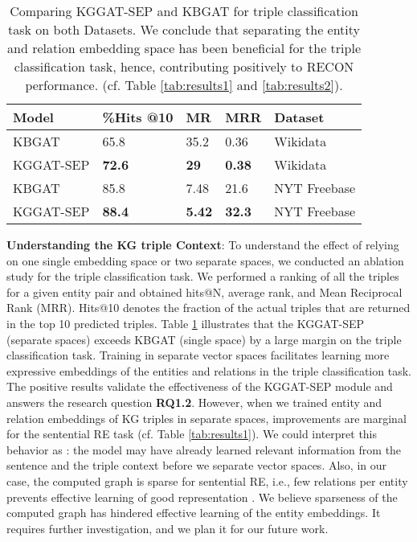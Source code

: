 \documentclass[sigconf]{acmart}
\newlength\Origarrayrulewidth
\newcommand{\Cline}[1]{\noalign{\global\setlength\Origarrayrulewidth{\arrayrulewidth}}\noalign{\global\setlength\arrayrulewidth{1.1pt}}\cline{#1}\noalign{\global\setlength\arrayrulewidth{\Origarrayrulewidth}}}
\begin{document}
\begin{table}[!htb]
    \centering
    \begin{tabular}{p{1.8cm}|p{1.5cm}|p{0.8cm}|p{0.8cm}|p{2.0cm}}
\toprule
\textbf{Model} & \%\textbf{Hits @10} & \textbf{MR} & \textbf{MRR}& \textbf{Dataset} \\
\midrule
        KBGAT & 65.8 & 35.2 & 0.36 & Wikidata\\
        KGGAT-SEP  & \textbf{72.6} &\textbf{29} & \textbf{0.38}& Wikidata \\
        \Cline{1-5}
         KBGAT & 85.8 & 7.48 & 21.6 & NYT Freebase\\
        KGGAT-SEP  & \textbf{88.4} &\textbf{5.42} & \textbf{32.3}& NYT Freebase \\
      \bottomrule
    \end{tabular}
    \caption{Comparing KGGAT-SEP and KBGAT for triple classification task on both Datasets. We conclude that separating the entity and relation embedding space has been beneficial for the triple classification task, hence, contributing positively to RECON performance. (cf. Table \ref{tab:results1} and \ref{tab:results2}).}
    \label{tab:tab-abl2}
        \vspace{-2mm}
\end{table}


\textbf{Understanding the KG triple Context}: To understand the effect of relying on one single embedding space or two separate spaces, we conducted an ablation study for the triple classification task. We performed a ranking of all the triples for a given entity pair and obtained hits@N, average rank, and Mean Reciprocal Rank (MRR). Hits@10 denotes the fraction of the actual triples that are returned in the top 10 predicted triples. Table \ref{tab:tab-abl2} illustrates that the KGGAT-SEP (separate spaces) exceeds KBGAT (single space) by a large margin on the triple classification task. Training in separate vector spaces facilitates learning more expressive embeddings of the entities and relations in the triple classification task. The positive results validate the effectiveness of the KGGAT-SEP module and answers the research question \textbf{RQ1.2}. However, when we trained entity and relation embeddings of KG triples in separate spaces, improvements are marginal for the sentential RE task (cf. Table \ref{tab:results1}). We could interpret this behavior as : the model may have already learned relevant information from the sentence and the triple context before we separate vector spaces. Also, in our case, the computed graph is sparse for sentential RE, i.e., few relations per entity prevents effective learning of good representation \cite{DBLP:conf/acl/NathaniCSK19}. We believe sparseness of the computed graph has hindered effective learning of the entity embeddings. It requires further investigation, and we plan it for our future work.
\end{document}
